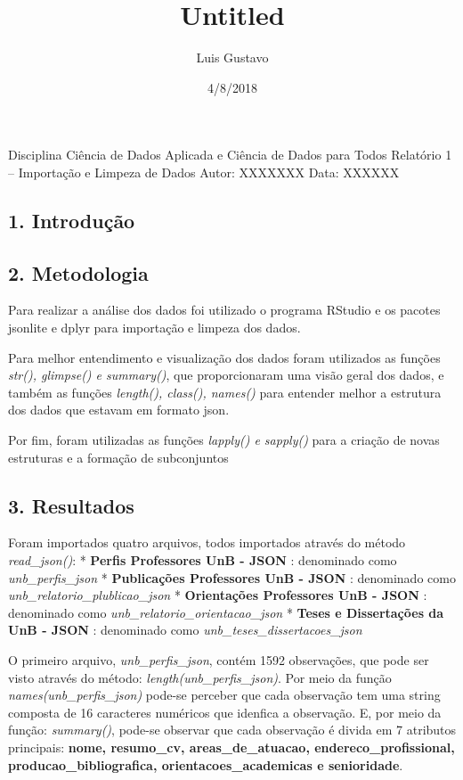 \documentclass[]{article}
\title{Untitled}
\author{Luis Gustavo}
\date{4/8/2018}
\begin{document}
\maketitle

Disciplina Ciência de Dados Aplicada e Ciência de Dados para Todos
Relatório 1 -- Importação e Limpeza de Dados Autor: XXXXXXX Data: XXXXXX

\subsection{1. Introdução}\label{introducao}

\subsection{2. Metodologia}\label{metodologia}

Para realizar a análise dos dados foi utilizado o programa RStudio e os
pacotes jsonlite e dplyr para importação e limpeza dos dados.

Para melhor entendimento e visualização dos dados foram utilizados as
funções \emph{str(), glimpse() e summary()}, que proporcionaram uma
visão geral dos dados, e também as funções \emph{length(), class(),
names()} para entender melhor a estrutura dos dados que estavam em
formato json.

Por fim, foram utilizadas as funções \emph{lapply() e sapply()} para a
criação de novas estruturas e a formação de subconjuntos

\subsection{3. Resultados}\label{resultados}

Foram importados quatro arquivos, todos importados através do método
\emph{read\_json()}: * \textbf{Perfis Professores UnB - JSON} :
denominado como \emph{unb\_perfis\_json} * \textbf{Publicações
Professores UnB - JSON} : denominado como
\emph{unb\_relatorio\_plublicao\_json} * \textbf{Orientações Professores
UnB - JSON} : denominado como \emph{unb\_relatorio\_orientacao\_json} *
\textbf{Teses e Dissertações da UnB - JSON} : denominado como
\emph{unb\_teses\_dissertacoes\_json}

O primeiro arquivo, \emph{unb\_perfis\_json}, contém 1592 observações,
que pode ser visto através do método: \emph{length(unb\_perfis\_json)}.
Por meio da função \emph{names(unb\_perfis\_json)} pode-se perceber que
cada observação tem uma string composta de 16 caracteres numéricos que
idenfica a observação. E, por meio da função: \emph{summary()}, pode-se
observar que cada observação é divida em 7 atributos principais:
\textbf{nome, resumo\_cv, areas\_de\_atuacao, endereco\_profissional,
producao\_bibliografica, orientacoes\_academicas e senioridade}.
\end{document}
